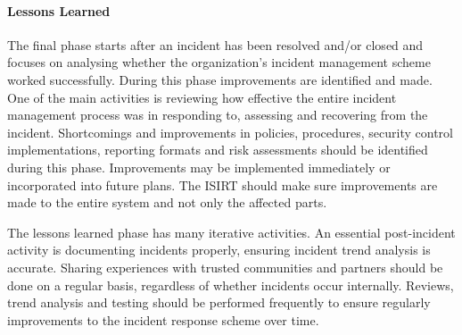 \paragraph{Lessons Learned} The final phase starts after an incident has been resolved and/or closed and focuses on analysing whether the organization's incident management scheme worked successfully. During this phase improvements are identified and made. One of the main activities is reviewing how effective the entire incident management process was in responding to, assessing and recovering from the incident. Shortcomings and improvements in policies, procedures, security control implementations, reporting formats and risk assessments should be identified during this phase. Improvements may be implemented immediately or incorporated into future plans. The \ac{ISIRT} should make sure improvements are made to the entire system and not only the affected parts.

The lessons learned phase has many iterative activities. An essential post-incident activity is documenting incidents properly, ensuring incident trend analysis is accurate. Sharing experiences with trusted communities and partners should be done on a regular basis, regardless of whether incidents occur internally. Reviews, trend analysis and testing should be performed frequently to ensure regularly improvements to the incident response scheme over time. 




